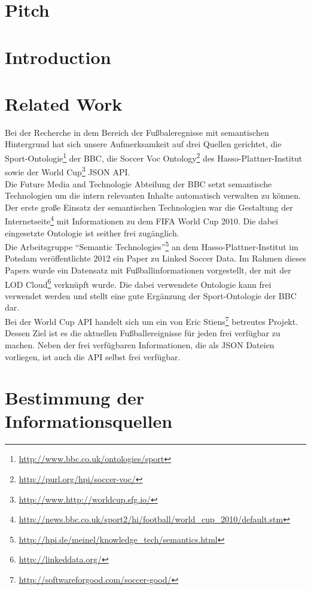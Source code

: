 \documentclass[runningheads,a4paper]{llncs}
\begin{document}
\section{Pitch}

\section{Introduction}
\newpage
\section{Related Work}

Bei der Recherche in dem Bereich der Fußbaleregnisse mit semantischen Hintergrund hat sich unsere Aufmerksamkeit auf drei Quellen gerichtet, die Sport-Ontologie\footnote{\url{http://www.bbc.co.uk/ontologies/sport}} der BBC, die Soccer Voc Ontology\footnote{\url{http://purl.org/hpi/soccer-voc/}} des Hasso-Plattner-Institut sowie der World Cup\footnote{\url{http://www.http://worldcup.sfg.io/}} JSON API.\\ Die Future Media and Technologie Abteilung der BBC setzt semantische Technologien um die intern relevanten Inhalte automatisch verwalten zu können. Der erste große Einsatz der semantischen Technologien war die Gestaltung der Internetseite\footnote{\url{http://news.bbc.co.uk/sport2/hi/football/world_cup_2010/default.stm}} mit Informationen zu dem FIFA World Cup 2010. Die dabei eingesetzte Ontologie ist seither frei zugänglich. \\
Die Arbeitsgruppe "`Semantic Technologies"'\footnote{\url{http://hpi.de/meinel/knowledge_tech/semantics.html}} an dem Hasso-Plattner-Institut im Potsdam veröffentlichte 2012 ein Paper zu Linked Soccer Data\cite{url_lsd}. Im Rahmen dieses Papers wurde ein Datensatz mit Fußballinformationen vorgestellt, der mit der LOD Cloud\footnote{\url{http://linkeddata.org/}} verknüpft wurde. Die dabei verwendete Ontologie kann frei verwendet werden und stellt eine gute Ergänzung der Sport-Ontologie der BBC dar.\\
Bei der World Cup API handelt sich um ein von Eric Stiens\footnote{\url{http://softwareforgood.com/soccer-good/}} betreutes Projekt. Dessen Ziel ist es die aktuellen Fußballereignisse für jeden frei verfügbar zu machen. Neben der frei verfügbaren Informationen, die als JSON Dateien vorliegen, ist auch die API selbst frei verfügbar. 

\newpage
\section{Bestimmung der Informationsquellen}\label{infoQuell}
\end{document}
